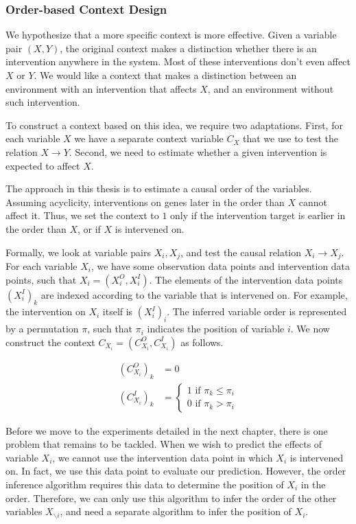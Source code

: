 \subsubsection{Order-based Context Design}

We hypothesize that a more specific context is more effective. Given a variable pair $(X,Y)$, the original context makes a distinction whether there is an intervention anywhere in the system. Most of these interventions don't even affect $X$ or $Y$. We would like a context that makes a distinction between an environment with an intervention that affects $X$, and an environment without such intervention. 

To construct a context based on this idea, we require two adaptations. First, for each variable $X$ we have a separate context variable $C_X$ that we use to test the relation $X\to Y$. Second, we need to estimate whether a given intervention is expected to affect $X$. 

The approach in this thesis is to estimate a causal order of the variables. Assuming acyclicity, interventions on genes later in the order than $X$ cannot affect it. Thus, we set the context to $1$ only if the intervention target is earlier in the order than $X$, or if $X$ is intervened on. 

Formally, we look at variable pairs $X_i, X_j$, and test the causal relation $X_i\to X_j$. For each variable $X_i$, we have some observation data points and intervention data points, such that $X_i = (X^O_i, X^I_i)$. The elements of the intervention data points $(X^I_i)_k$ are indexed according to the variable that is intervened on. For example, the intervention on $X_i$ itself is $(X^I_i)_i$. The inferred variable order is represented by a permutation $\pi$, such that $\pi_i$ indicates the position of variable $i$. We now construct the context $C_{X_i} = (C^O_{X_i}, C^I_{X_i})$ as follows.

$$\begin{array}{ll}
(C^O_{X_i})_k & =0 \\
(C^I_{X_i})_k & = \begin{cases}
    1 \text{ if } \pi_k\leq \pi_i \\
    0 \text{ if } \pi_k> \pi_i    
\end{cases}
\end{array}$$

Before we move to the experiments detailed in the next chapter, there is one problem that remains to be tackled. When we wish to predict the effects of variable $X_i$, we cannot use the intervention data point in which $X_i$ is intervened on. In fact, we use this data point to evaluate our prediction. However, the order inference algorithm requires this data to determine the position of $X_i$ in the order. Therefore, we can only use this algorithm to infer the order of the other variables $X_{\backslash i}$, and need a separate algorithm to infer the position of $X_i$.

